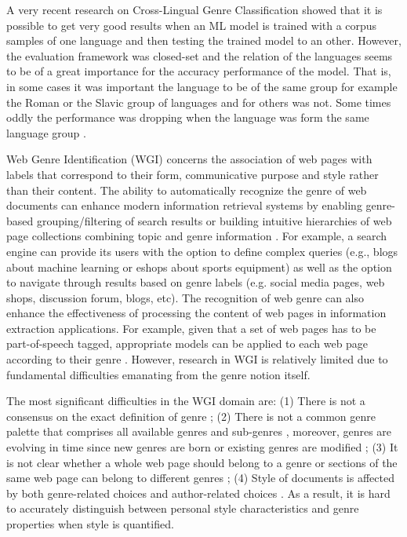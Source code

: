 A very recent research on Cross-Lingual Genre Classification showed that it is possible to get very good results when an ML model is trained with a corpus samples of one language and then testing the trained model to an other. However, the evaluation framework was closed-set and the relation of the languages seems to be of a great importance for the accuracy performance of the model. That is, in some cases it was important the language to be of the same group for example the Roman or the Slavic group of languages and for others was not. Some times oddly the performance was dropping when the language was form the same language group \parencite{nguyen2019cross}.

Web Genre Identification (WGI) concerns the association of web pages with labels that correspond to their form, communicative purpose and style rather than their content. The ability to automatically recognize the genre of web documents can enhance modern information retrieval systems by enabling genre-based grouping/filtering of search results or building intuitive hierarchies of web page collections combining topic and genre information \parencite{Braslavski2007,Rosso2008,de2009genre}. For example, a search engine can provide its users with the option to define complex queries (e.g., blogs about machine learning or eshops about sports equipment) as well as the option to navigate through results based on genre labels (e.g. social media pages, web shops, discussion forum, blogs, etc). The recognition of web genre can also enhance the effectiveness of processing the content of web pages in information extraction applications. For example, given that a set of web pages has to be part-of-speech tagged, appropriate models can be applied to each web page according to their genre \parencite{Nooralahzadeh2014}. However, research in WGI is relatively limited due to fundamental difficulties emanating from the genre notion itself.


The most significant difficulties in the WGI domain are: (1) There is not a consensus on the exact definition of genre \parencite{crowston2011problems}; (2) There is not a common genre  palette that comprises all available genres and sub-genres \parencite{santini2011cross,mehler2010genres_on_web,mason2009n,sharoff2010web}, moreover, genres are evolving in time since new  genres are born or existing genres are modified \parencite{Boese2005}; (3) It is not clear whether a whole web page should belong to a genre or sections of the same web page can belong to  different genres \parencite{jebari2015combination,madjarov2015web}; (4) Style of documents is affected by both genre-related choices and author-related choices \parencite{petrenz2011stable,Sharroff2010}. As a result, it is hard to accurately distinguish between personal style characteristics and genre properties when style is quantified.


